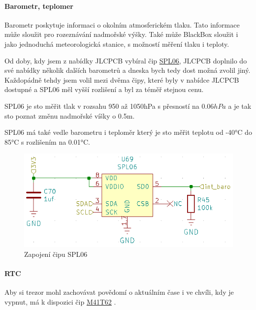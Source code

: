 \newpage

\paragraph{Barometr, teplomer}
Barometr poskytuje informaci o okolním atmosferickém tlaku. 
Tato informace může sloužit pro rozeznávání nadmořské výšky. 
Také může BlackBox sloužit i jako jednoduchá meteorologická stanice, s možností měření tlaku i teploty.

Od doby, kdy jsem z nabídky JLCPCB vybíral čip \href{https://datasheet.lcsc.com/szlcsc/1907081118_Goertek-SPL06-007_C233787.pdf}{SPL06}, 
JLCPCB doplnilo do své nabídky několik dalších barometrů a dneska bych tedy dost možná zvolil jiný. Každopádně tehdy jsem volil 
mezi dvěma čipy, které byly v nabídce JLCPCB dostupné a SPL06 měl vyšší rozlišení a byl za téměř stejnou cenu.

SPL06 je sto měřit tlak v rozsahu 950 až 1050hPa s přesností na $0.06 hPa$ a je tak sto poznat změnu nadmořské víšky o 0.5m.

SPL06 má také vedle barometru i teploměr který je sto měřit teplotu od -40°C do 85°C s rozlišením na 0.01°C.

\begin{figure}[htbp]
    \centering
    \includegraphics[width=\textwidth]{kapitoly/obrazky/E4/vnimani/SPL06.png}
    \caption{Zapojení čipu SPL06}
    \label{fig:E4-SPL06}
\end{figure}

\newpage

\paragraph{RTC}
Aby si trezor mohl zachovávat povědomí o aktuálním čase i ve chvíli, kdy je vypnut, má k dispozici čip 
\href{https://datasheet.lcsc.com/szlcsc/STMicroelectronics-M41T62Q6F_C113207.pdf}{M41T62} \parencite{m41t62}.

